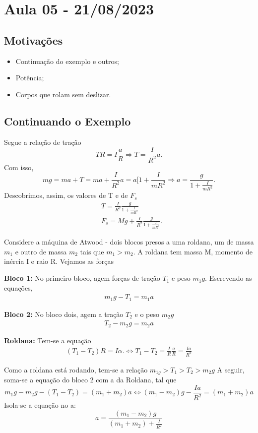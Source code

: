 \documentclass[physicsII_notes.tex]{subfiles}
\begin{document}
\section{Aula 05 - 21/08/2023}
\subsection{Motivações}
\begin{itemize}
	\item Continuação do exemplo e outros;
	\item Potência;
	\item Corpos que rolam sem deslizar.
\end{itemize}
\subsection{Continuando o Exemplo}
\begin{example}[continuando...]
	Segue a relação de tração
	\[
		TR = I \frac{a}{R} \Rightarrow T = \frac{I}{R^{2}}a.
	\]
	Com isso,
	\[
		mg = ma + T = ma + \frac{I}{R^{2}}a = a[1 + \frac{I}{mR^{2}} \Rightarrow a = \frac{g}{1 + \frac{I}{mR^{2}}}.
	\]
	Descobrimos, assim, os valores de T e de \(F_{s}\)
	\begin{align*}
		 & T = \frac{I}{R^{2}}\frac{g}{1+ \frac{I}{mR^{2}}}          \\
		 & F_{s} = Mg + \frac{I}{R^{2}}\frac{g}{1+\frac{I}{mR^{2}}}.
	\end{align*}
\end{example}
\begin{example}
	Considere a máquina de Atwood - dois blocos presos a uma roldana, um de massa \(m_{1}\) e outro de massa \(m_{2}\) tais que \(m_{1} > m_{2}\).
	A roldana tem massa M, momento de inércia I e raio R. Vejamos as forças

	\textbf{Bloco 1:}
	No primeiro bloco, agem forças de tração \(T_{1}\) e peso \(m_{1}g\). Escrevendo as equações,
	\begin{align*}
		m_{1}g - T_{1} = m_{1}a
	\end{align*}

	\textbf{Bloco 2:}
	No bloco dois, agem a tração \(T_{2}\) e o peso \(m_{2}g\)
	\begin{align*}
		T_{2}-m_{2}g = m_{2}a
	\end{align*}

	\textbf{Roldana:}
	Tem-se a equação
	\begin{align*}
		(T_{1} - T_{2})R = I\alpha. \Longleftrightarrow T_{1} - T_{2} = \frac{I}{R}\frac{a}{R} = \frac{Ia}{R^{2}}
	\end{align*}

	Como a roldana está rodando, tem-se a relação \(m_{1g} > T_{1} > T_{2} > m_{2}g\)
	A seguir, soma-se a equação do bloco 2 com a da Roldana, tal que
	\[
		m_{1}g - m_{2}g - (T_{1}-T_{2}) = (m_{1}+m_{2})a \Longleftrightarrow (m_{1}-m_{2})g - \frac{Ia}{R^{2}} = (m_{1}+m_{2})a
	\]
	Isola-se a equação no a:
	\[
		a = \frac{(m_{1}-m_{2})g}{(m_{1}+m_{2})+\frac{I}{R^{2}}}
	\]
\end{example}
\end{document}
